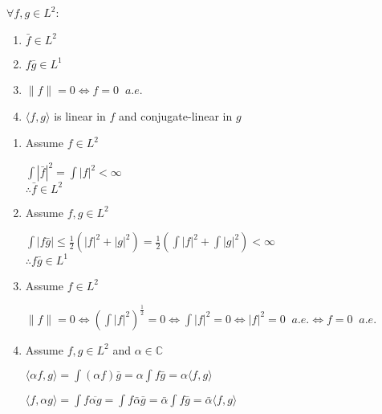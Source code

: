 \documentclass[letterpaper,12pt,fleqn]{article}
\newcommand{\abs}[1]{\left|#1\right|}
\newcommand{\norm}[1]{\lVert#1\rVert}
\newcommand{\inner}[2]{\langle#1,#2\rangle}
\newcommand{\conj}[1]{\bar{#1}}
\newcommand{\Conj}[1]{\overline{#1}}
\begin{document}
\begin{properties}
$\forall f,g\in L^2$:

\begin{enumerate}
\item{$\conj{f}\in L^2$}
\item{$f\conj{g}\in L^1$}
\item{$\norm{f}=0\iff f=0\;\; a.e.$}
\item{$\inner{f}{g}$ is linear in $f$ and conjugate-linear in $g$}
\end{enumerate}
\end{properties}

\begin{theproof}
\listbreak
\begin{enumerate}
\item{Assume $f\in L^2$}

$\int\abs{\conj{f}}^2=\int\abs{f}^2<\infty$ \\
$\therefore \conj{f}\in L^2$

\item{Assume $f,g\in L^2$}

$\int\abs{f\conj{g}}\le\frac{1}{2}\left(\abs{f}^2+\abs{g}^2\right)
    =\frac{1}{2}\left(\int\abs{f}^2+\int\abs{g}^2\right)<\infty$ \\
$\therefore f\conj{g}\in L^1$

\item{Assume $f\in L^2$}

$\norm{f}=0\iff\left(\int\abs{f}^2\right)^{\frac{1}{2}}=0\iff
    \int\abs{f}^2=0\iff\abs{f}^2=0\;\;a.e.\iff f=0\;\;a.e.$

\item{Assume $f,g\in L^2$ and $\alpha\in\mathbb{C}$}

$\inner{\alpha f}{g}=\int(\alpha f)\conj{g}=\alpha\int f\conj{g}=
    \alpha\inner{f}{g}$

$\inner{f}{\alpha g}=\int f\Conj{\alpha g}=\int f\conj{\alpha}\conj{g}=
    \conj{\alpha}\int f\conj{g}=\conj{\alpha}\inner{f}{g}$
\end{enumerate}
\end{theproof}
\end{document}
